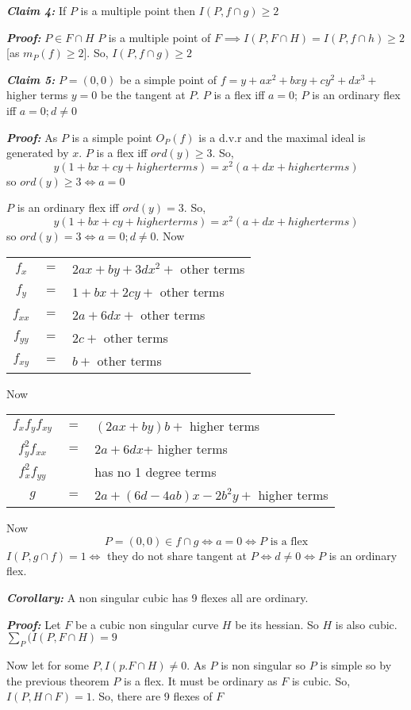 \documentclass[11pt]{article}
\begin{document}
{\textbf{\textit{Claim 4: }}If $P$ is a multiple point then $I(P,f\cap g)\geq 2$

\textbf{\textit{Proof: }}$P\in F\cap H$ $P$ is a multiple point of $F\implies I(P,F\cap H)=I(P,f\cap h)\geq 2$ [as $m_P(f)\geq 2$]. So, $I(P,f\cap g)\geq 2$\Qed

\textbf{\textit{Claim 5: }}$P=(0,0)$ be a simple point of  $f=y+ax^2+bxy+cy^2+dx^3+$ higher terms $y=0$ be the tangent at $P$. $P$ is a flex iff $a=0$; $P$ is an ordinary flex iff $a=0;d\neq 0$

\textbf{\textit{Proof: }}As $P$ is a simple point $O_P(f)$ is a d.v.r and the maximal ideal is generated by $x$. $P$ is a flex iff $ord(y)\geq 3$. So, $$y(1+bx+cy+higher terms)=x^2(a+dx+higher terms)$$so $ord(y)\geq 3\iff a=0$

\parinn
$P$ is an ordinary flex iff $ord(y)= 3$. So, $$y(1+bx+cy+higher terms)=x^2(a+dx+higher terms)$$so $ord(y)= 3\iff a=0;d\neq 0$. Now 
\begin{center}
	\begin{tabular}{ccl}
$f_x$&$=$&$2ax+by+3dx^2+$ other terms\\[1mm]
$f_y$&$=$&$1+bx+2cy+$ other terms\\ [1mm]
$f_{xx}$&$=$&$2a+6dx+$ other terms\\[1mm]
$f_{yy}$&$=$&$2c+$ other terms\\[1mm]
$f_{xy}$&$=$&$b+$ other terms
\end{tabular}
\end{center}
Now 

\begin{center}
	\begin{tabular}{ccl}
$f_xf_yf_{xy}$&$=$&$(2ax+by)b+$ higher terms\\[1mm]
$f_y^2f_{xx}$&$=$&$2a+6dx$+ higher terms\\[1mm]
$f_x^2f_{yy}$ && has no 1 degree terms\\[1mm]
$g$&$=$&$2a+(6d-4ab)x-2b^2 y+$ higher terms
\end{tabular}
\end{center}
Now $$P=(0,0)\in f\cap g \iff a=0 \iff P\text{ is a flex}$$ $I(P,g\cap f)=1\iff $ they do not share tangent at $P\iff d\neq 0\iff P$ is an ordinary flex.
\parinf

\textbf{\textit{Corollary: }}A non singular cubic has 9 flexes all are ordinary. 

\textbf{\textit{Proof: }}Let $F$ be a cubic non singular curve $H$ be its hessian. So $H$ is also cubic. $\sum\limits_P(I(P,F\cap H)=9$


Now let for some $P,I(p.F\cap H)\neq 0$. As $P$ is non singular so $P$ is simple so by the previous theorem $P$ is a flex. It must be ordinary as $F$ is cubic. So, $I(P,H\cap F)=1$. So, there are 9 flexes of $F$
}
\end{document}
